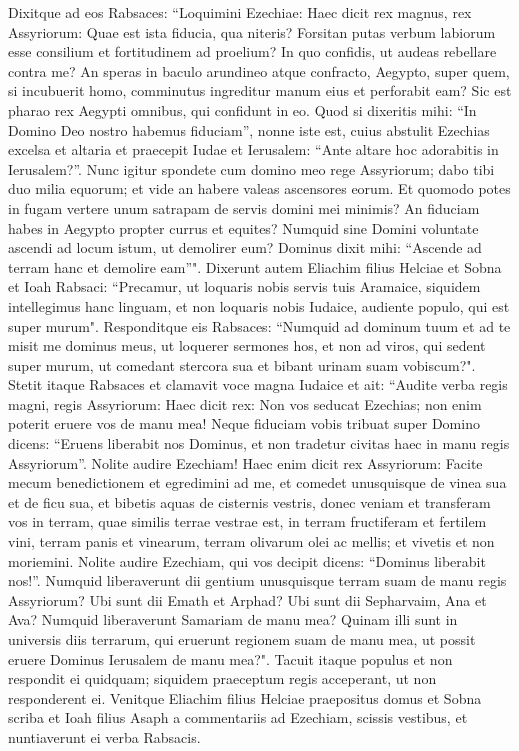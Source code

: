 \begin{biblechapter}
\verse Dixitque ad eos Rabsaces: “Loquimini Ezechiae: Haec dicit rex magnus, rex Assyriorum: Quae est ista fiducia, qua niteris? 
\verse Forsitan putas verbum labiorum esse consilium et fortitudinem ad proelium? In quo confidis, ut audeas rebellare contra me? 
\verse An speras in baculo arundineo atque confracto, Aegypto, super quem, si incubuerit homo, comminutus ingreditur manum eius et perforabit eam? Sic est pharao rex Aegypti omnibus, qui confidunt in eo. 
\verse Quod si dixeritis mihi: “In Domino Deo nostro habemus fiduciam”, nonne iste est, cuius abstulit Ezechias excelsa et altaria et praecepit Iudae et Ierusalem: “Ante altare hoc adorabitis in Ierusalem?”. 
\verse Nunc igitur spondete cum domino meo rege Assyriorum; dabo tibi duo milia equorum; et vide an habere valeas ascensores eorum. 
\verse Et quomodo potes in fugam vertere unum satrapam de servis domini mei minimis? An fiduciam habes in Aegypto propter currus et equites? 
\verse Numquid sine Domini voluntate ascendi ad locum istum, ut demolirer eum? Dominus dixit mihi: “Ascende ad terram hanc et demolire eam”". 
\verse Dixerunt autem Eliachim filius Helciae et Sobna et Ioah Rabsaci: “Precamur, ut loquaris nobis servis tuis Aramaice, siquidem intellegimus hanc linguam, et non loquaris nobis Iudaice, audiente populo, qui est super murum". 
\verse Responditque eis Rabsaces: “Numquid ad dominum tuum et ad te misit me dominus meus, ut loquerer sermones hos, et non ad viros, qui sedent super murum, ut comedant stercora sua et bibant urinam suam vobiscum?". 
\verse Stetit itaque Rabsaces et clamavit voce magna Iudaice et ait: “Audite verba regis magni, regis Assyriorum: 
\verse Haec dicit rex: Non vos seducat Ezechias; non enim poterit eruere vos de manu mea! 
\verse Neque fiduciam vobis tribuat super Domino dicens: “Eruens liberabit nos Dominus, et non tradetur civitas haec in manu regis Assyriorum”. 
\verse Nolite audire Ezechiam! Haec enim dicit rex Assyriorum: Facite mecum benedictionem et egredimini ad me, et comedet unusquisque de vinea sua et de ficu sua, et bibetis aquas de cisternis vestris, 
\verse donec veniam et transferam vos in terram, quae similis terrae vestrae est, in terram fructiferam et fertilem vini, terram panis et vinearum, terram olivarum olei ac mellis; et vivetis et non moriemini. Nolite audire Ezechiam, qui vos decipit dicens: “Dominus liberabit nos!”. 
\verse Numquid liberaverunt dii gentium unusquisque terram suam de manu regis Assyriorum? 
\verse Ubi sunt dii Emath et Arphad? Ubi sunt dii Sepharvaim, Ana et Ava? Numquid liberaverunt Samariam de manu mea? 
\verse Quinam illi sunt in universis diis terrarum, qui eruerunt regionem suam de manu mea, ut possit eruere Dominus Ierusalem de manu mea?". 
\verse Tacuit itaque populus et non respondit ei quidquam; siquidem praeceptum regis acceperant, ut non responderent ei. 
\verse Venitque Eliachim filius Helciae praepositus domus et Sobna scriba et Ioah filius Asaph a commentariis ad Ezechiam, scissis vestibus, et nuntiaverunt ei verba Rabsacis. 
\end{biblechapter}

